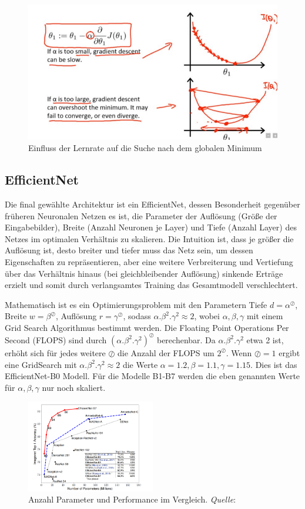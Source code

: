 \begin{figure}[H]
\centering
\includegraphics[width=0.5\linewidth]{pic/Klassifikation/Lernrate.png}
\caption{\label{pic:Lernrate} Einfluss der Lernrate auf die Suche nach dem globalen Minimum}
\end{figure}

\subsection{EfficientNet}
\label{EfficientNet}
Die final gewählte Architektur ist ein EfficientNet, dessen Besonderheit gegenüber früheren Neuronalen Netzen es ist, die Parameter der Auflösung (Größe der Eingabebilder), Breite (Anzahl Neuronen je Layer) und Tiefe (Anzahl Layer) des Netzes im optimalen Verhältnis zu skalieren. Die Intuition ist, dass je größer die Auflösung ist, desto breiter und tiefer muss das Netz sein, um dessen Eigenschaften zu repräsentieren, aber eine weitere Verbreiterung und Vertiefung über das Verhältnis hinaus (bei gleichbleibender Auflösung) sinkende Erträge erzielt und somit durch verlangsamtes Training das Gesamtmodell verschlechtert.

Mathematisch ist es ein Optimierungsproblem mit den Parametern Tiefe $d = \alpha^\oslash$, Breite $w = \beta^\oslash$, Auflösung $r = \gamma^\oslash$, sodass $\alpha.\beta^2.\gamma^2 \approx 2$, wobei $\alpha,\beta,\gamma$ mit einem Grid Search Algorithmus bestimmt werden. Die Floating Point Operations Per Second (FLOPS) sind durch $(\alpha.\beta^2.\gamma^2)^\oslash$ berechenbar. Da $\alpha.\beta^2.\gamma^2$ etwa 2 ist, erhöht sich für jedes weitere $\oslash$ die Anzahl der FLOPS um $2^\oslash$. Wenn $\oslash = 1$ ergibt eine GridSearch mit $\alpha.\beta^2.\gamma^2 \approx 2$ die Werte $\alpha = 1.2, \beta = 1.1, \gamma = 1.15$. Dies ist das EfficientNet-B0 Modell. Für die Modelle B1-B7 werden die eben genannten Werte für $\alpha, \beta, \gamma$ nur noch skaliert.

\begin{figure}[H]
\centering
\includegraphics[width=0.5\textwidth]{./pic/Klassifikation/EfficientNetPerformance.png}
\caption{Anzahl Parameter und Performance im Vergleich. \textit{Quelle}: \cite{22}}
\end{figure}

